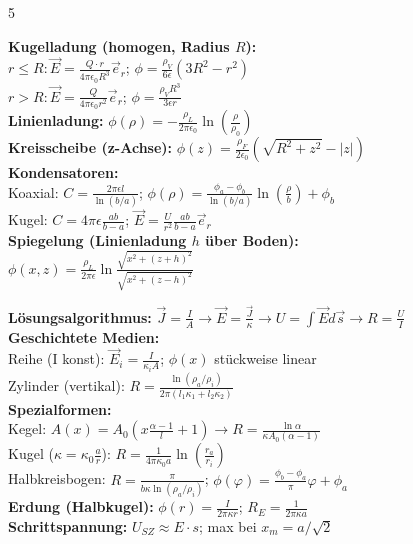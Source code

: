\documentclass[a4paper, 2pt, landscape]{extarticle}
\begin{document}
\begin{multicols*}{5}
\begin{tcolorbox}[title={Elektrostatik (B1, B3, B4)}]
\textbf{Kugelladung (homogen, Radius $R$):} \\
$r \le R: \vec{E} = \frac{Q \cdot r}{4\pi\epsilon_0 R^3} \vec{e}_r$; \quad $\phi = \frac{\rho_V}{6\epsilon}(3R^2 - r^2)$ \\
$r > R: \vec{E} = \frac{Q}{4\pi\epsilon_0 r^2} \vec{e}_r$; \quad $\phi = \frac{\rho_V R^3}{3\epsilon r}$ \\
\textbf{Linienladung:} $\phi(\rho) = -\frac{\rho_L}{2\pi\epsilon_0} \ln(\frac{\rho}{\rho_0})$ \\
\textbf{Kreisscheibe (z-Achse):} $\phi(z) = \frac{\rho_F}{2\epsilon_0}(\sqrt{R^2+z^2}-|z|)$ \\
\textbf{Kondensatoren:} \\
Koaxial: $C = \frac{2\pi\epsilon l}{\ln(b/a)}$; \quad $\phi(\rho) = \frac{\phi_a-\phi_b}{\ln(b/a)}\ln(\frac{\rho}{b}) + \phi_b$ \\
Kugel: $C = 4\pi\epsilon \frac{ab}{b-a}$; \quad $\vec{E} = \frac{U}{r^2}\frac{ab}{b-a}\vec{e}_r$ \\
\textbf{Spiegelung (Linienladung $h$ über Boden):} \\
$\phi(x,z) = \frac{\rho_L}{2\pi\epsilon} \ln \frac{\sqrt{x^2+(z+h)^2}}{\sqrt{x^2+(z-h)^2}}$
\end{tcolorbox}

\begin{tcolorbox}[title={Strömungsfelder \& Widerstände (B5, B8)}]
\textbf{Lösungsalgorithmus:} $\vec{J} = \frac{I}{A} \to \vec{E} = \frac{\vec{J}}{\kappa} \to U = \int \vec{E} d\vec{s} \to R = \frac{U}{I}$ \\
\textbf{Geschichtete Medien:} \\
Reihe (I konst): $\vec{E}_i = \frac{I}{\kappa_i A}$; \quad $\phi(x)$ stückweise linear \\
Zylinder (vertikal): $R = \frac{\ln(\rho_a/\rho_i)}{2\pi(l_1\kappa_1 + l_2\kappa_2)}$ \\
\textbf{Spezialformen:} \\
Kegel: $A(x) = A_0(x\frac{\alpha-1}{l}+1) \to R = \frac{\ln \alpha}{\kappa A_0 (\alpha-1)}$ \\
Kugel ($\kappa = \kappa_0 \frac{a}{r}$): $R = \frac{1}{4\pi\kappa_0 a} \ln(\frac{r_a}{r_i})$ \\
Halbkreisbogen: $R = \frac{\pi}{b \kappa \ln(\rho_a/\rho_i)}$; \quad $\phi(\varphi) = \frac{\phi_b-\phi_a}{\pi}\varphi + \phi_a$ \\
\textbf{Erdung (Halbkugel):} $\phi(r) = \frac{I}{2\pi\kappa r}$; \quad $R_E = \frac{1}{2\pi\kappa a}$ \\
\textbf{Schrittspannung:} $U_{SZ} \approx E \cdot s$; \quad max bei $x_m = a/\sqrt{2}$
\end{tcolorbox}


\end{multicols*}
\end{document}

